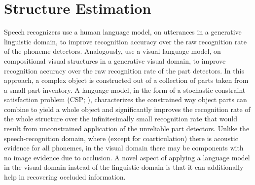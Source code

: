 \par\vspace{-1ex}
\section{Structure Estimation}
\label{sec:structure}

Speech recognizers use a human language model, on utterances in a generative
linguistic domain, to improve recognition accuracy over the raw recognition
rate of the phoneme detectors.
%
Analogously,  use a visual language
model, on compositional visual structures in a generative visual domain, to
improve recognition accuracy over the raw recognition rate of the part
detectors.
%
In this approach, a complex object is constructed out of a collection of parts
taken from a small part inventory.
%
A language model, in the form of a stochastic constraint-satisfaction problem
(CSP; ), characterizes the constrained way object parts can
combine to yield a whole object and significantly improves the recognition rate
of the whole structure over the infinitesimally small recognition rate that
would result from unconstrained application of the unreliable part detectors.
%
Unlike the speech-recognition domain, where (except for coarticulation) there
is acoustic evidence for all phonemes, in the visual domain there may be
components with no image evidence due to occlusion.
%
A novel aspect of applying a language model in the visual domain instead of the
linguistic domain is that it can additionally help in recovering occluded
information.

